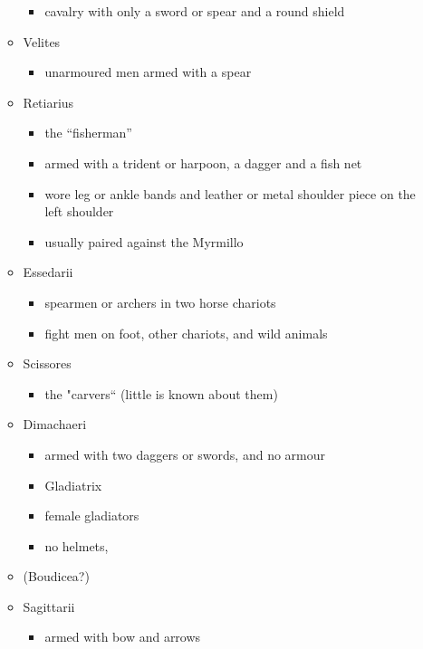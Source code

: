 \documentclass[12pt, twoside]{article}
\begin{document}
\begin{itemize}
\begin{itemize}
\begin{itemize}
		\item cavalry with only a sword or spear and a round shield
		\end{itemize}
	\item Velites
		\begin{itemize}
		\item unarmoured men armed with a spear
		\end{itemize}
	\item Retiarius
		\begin{itemize}
		\item the “fisherman”
		\item armed with a trident or harpoon, a dagger and a fish net
		\item wore leg or ankle bands and leather or metal shoulder piece on the left shoulder
		\item usually paired against the Myrmillo
		\end{itemize}
	\item Essedarii
		\begin{itemize}
		\item spearmen or archers in two horse chariots
		\item fight men on foot, other chariots, and wild animals
		\end{itemize}
	\item Scissores
		\begin{itemize}
		\item the "carvers“ (little is known about them)
		\end{itemize}
	\item Dimachaeri
		\begin{itemize}
		\item armed with two daggers or swords, and no armour
		\item Gladiatrix
		\item female gladiators
		\item no helmets,
		\end{itemize}
	\item (Boudicea?)
	\item Sagittarii
		\begin{itemize}
		\item armed with bow and arrows
		\end{itemize}
	\end{itemize}
\end{itemize}
\end{document}
